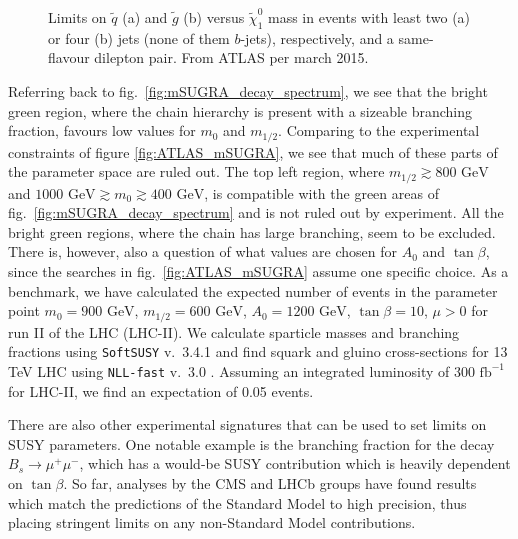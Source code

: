 \documentclass[twoside,english]{uiofysmaster}
\begin{document}
\begin{figure}[hbt]
\begin{subfigure}[b]{0.45\textwidth}
	\caption{ }
	\label{fig:ATLAS_neutralinogluino_b}
\end{subfigure}
\caption{Limits on $\tilde q$ (a) and $\tilde g$ (b) versus $\tilde \chi_1^0$ mass in events with least two (a) or four (b) jets (none of them $b$-jets), respectively, and a same-flavour dilepton pair. From ATLAS per march 2015.}
\label{fig:ATLAS_neutralinogluino}
\end{figure}

Referring back to fig.\ \ref{fig:mSUGRA_decay_spectrum}, we see that the bright green region, where the chain hierarchy is present with a sizeable branching fraction, favours low values for $m_0$ and $m_{1/2}$. Comparing to the experimental constraints of figure \ref{fig:ATLAS_mSUGRA}, we see that much of these parts of the parameter space are ruled out. The top left region, where $m_{1/2} \gtrsim 800\,\,\mathrm{GeV}$ and $1000 \,\,\mathrm{GeV} \gtrsim m_0 \gtrsim 400 \,\,\mathrm{GeV}$, is compatible with the green areas of fig.\ \ref{fig:mSUGRA_decay_spectrum} and is not ruled out by experiment. All the bright green regions, where the chain has large branching, seem to be excluded. There is, however, also a question of what values are chosen for $A_0$ and $\tan\beta$, since the searches in fig.\ \ref{fig:ATLAS_mSUGRA} assume one specific choice. As a benchmark, we have calculated the expected number of events in the parameter point $m_0 = 900 \,\,\mathrm{GeV}$, $m_{1/2} = 600 \,\,\mathrm{GeV}$, $A_0 = 1200\,\,\mathrm{GeV}$, $\tan\beta = 10$, $\mu>0$ for run II of the LHC (LHC-II). We calculate sparticle masses and branching fractions using {\tt SoftSUSY} v.\ 3.4.1 \cite{Allanach:2001kg} and find squark and gluino cross-sections for 13 TeV LHC using {\tt NLL-fast} v.\ 3.0 \cite{Beenakker:1996ch,Kulesza:2008jb,Kulesza:2009kq,Beenakker:2009ha,Beenakker:2011fu,Beenakker:1997ut,Beenakker:2010nq}. Assuming an integrated luminosity of $300\,\,\mathrm{fb}^{-1}$ for LHC-II, we find an expectation of 0.05 events. 

There are also other experimental signatures that can be used to set limits on SUSY parameters. One notable example is the branching fraction for the decay $B_s \to \mu^+ \mu^-$, which has a would-be SUSY contribution which is heavily dependent on $\tan\beta$. So far, analyses by the CMS and LHCb groups \cite{CMS:2014xfa} have found results which match the predictions of the Standard Model to high precision, thus placing stringent limits on any non-Standard Model contributions. 
\end{document}
